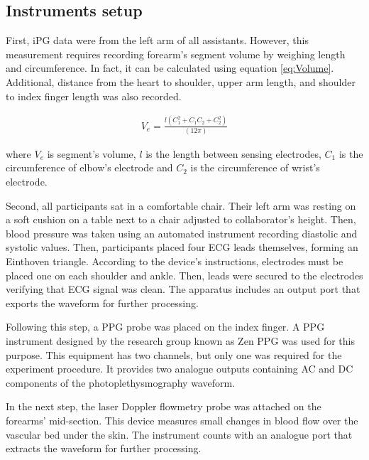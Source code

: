 \subsection{Instruments setup}
\label{section4.1.1}

First, iPG data were from the left arm of all assistants. However, this measurement requires recording forearm's segment volume by weighing length and circumference. In fact, it can be calculated using equation \ref{eq:Volume}. Additional, distance from the heart to shoulder, upper arm length, and shoulder to index finger length was also recorded. 

\begin{align}
\label{eq:Volume}
V_e =\frac{l(C_1^2+C_1 C_2 + C_2^2)}{(12\pi)}
\end{align}

where $V_e$ is segment's volume, $l$ is the length between sensing electrodes, $C_1$ is the circumference of elbow's electrode and $C_2$ is the circumference of wrist's electrode.

Second, all participants sat in a comfortable chair. Their left arm was resting on a soft cushion on a table next to a chair adjusted to collaborator's height. Then, blood pressure was taken using an automated instrument recording diastolic and systolic values. Then, participants placed four ECG leads themselves, forming an Einthoven triangle. According to the device's instructions, electrodes must be placed one on each shoulder and ankle. Then, leads were secured to the electrodes verifying that ECG signal was clean. The apparatus includes an output port that exports the waveform for further processing.



Following this step, a PPG probe was placed on the index finger. A PPG instrument designed by the research group known as Zen PPG was used for this purpose. This equipment has two channels, but only one was required for the experiment procedure. It provides two analogue outputs containing AC and DC components of the photoplethysmography waveform. 


In the next step, the laser Doppler flowmetry probe was attached on the forearms' mid-section. This device measures small changes in blood flow over the vascular bed under the skin. The instrument counts with an analogue port that extracts the waveform for further processing.  

